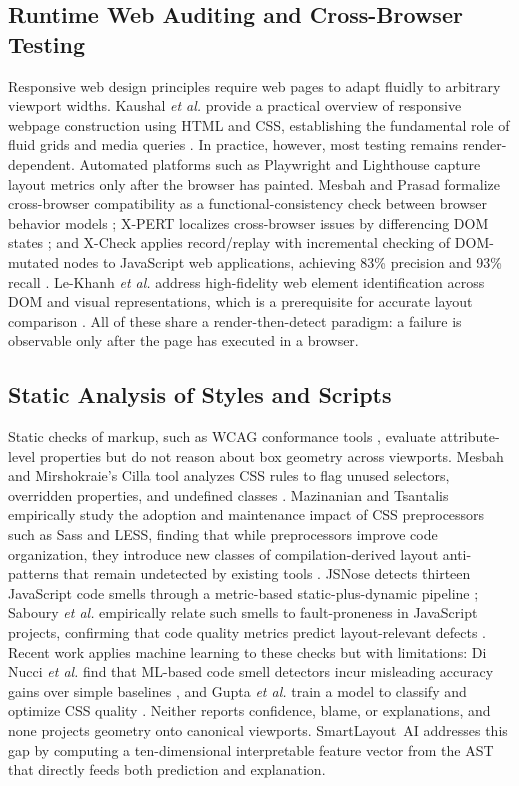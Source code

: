 \documentclass[conference]{IEEEtran}
\begin{document}
\subsection{Runtime Web Auditing and Cross-Browser Testing}
Responsive web design principles \cite{marcotte2011responsive} require
web pages to adapt fluidly to arbitrary viewport widths. Kaushal
\emph{et al.} provide a practical overview of responsive webpage
construction using HTML and CSS, establishing the fundamental role of
fluid grids and media queries \cite{kaushal2022responsive}. In practice,
however, most testing remains render-dependent. Automated platforms
such as Playwright \cite{playwright2024} and Lighthouse
\cite{lighthouse2022} capture layout metrics only after the browser has
painted. Mesbah and Prasad formalize cross-browser compatibility as a
functional-consistency check between browser behavior models
\cite{mesbah2011crossbrowser}; X-PERT localizes cross-browser issues by
differencing DOM states \cite{choudhary2013xpert}; and X-Check applies
record/replay with incremental checking of DOM-mutated nodes to
JavaScript web applications, achieving 83\% precision and 93\% recall
\cite{wu2021xcheck}. Le-Khanh \emph{et al.} address high-fidelity
web element identification across DOM and visual representations,
which is a prerequisite for accurate layout comparison
\cite{le2024hifi}. All of these share a render-then-detect paradigm: a
failure is observable only after the page has executed in a browser.

\subsection{Static Analysis of Styles and Scripts}
Static checks of markup, such as WCAG conformance tools \cite{wcag21},
evaluate attribute-level properties but do not reason about box geometry
across viewports. Mesbah and Mirshokraie's Cilla tool analyzes CSS
rules to flag unused selectors, overridden properties, and undefined
classes \cite{mesbah2012css}. Mazinanian and Tsantalis empirically study
the adoption and maintenance impact of CSS preprocessors such as Sass
and LESS, finding that while preprocessors improve code organization,
they introduce new classes of compilation-derived layout anti-patterns
that remain undetected by existing tools \cite{mazinanian2016csspre}.
JSNose detects thirteen JavaScript code smells through a metric-based
static-plus-dynamic pipeline \cite{fard2013jsnose}; Saboury \emph{et
al.} empirically relate such smells to fault-proneness in JavaScript
projects, confirming that code quality metrics predict layout-relevant
defects \cite{saboury2017smells}. Recent work applies machine learning
to these checks but with limitations: Di Nucci \emph{et al.} find that
ML-based code smell detectors incur misleading accuracy gains over
simple baselines \cite{dinucci2018mlsmells}, and Gupta \emph{et al.}
train a model to classify and optimize CSS quality
\cite{gupta2024cssai}. Neither reports confidence, blame, or
explanations, and none projects geometry onto canonical viewports.
SmartLayout~AI addresses this gap by computing a ten-dimensional
interpretable feature vector from the AST that directly feeds both
prediction and explanation.
\end{document}
